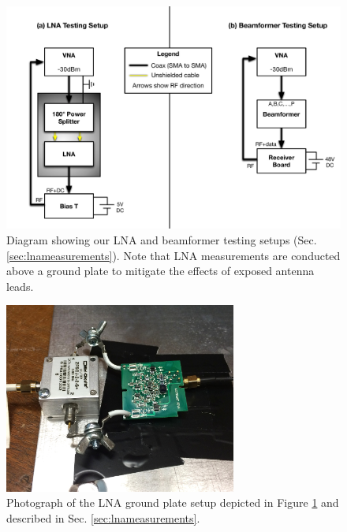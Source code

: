 \begin{figure}[t]
\centering
\includegraphics[width=6in]{chap2_beamforming_errors/vna_measurements_diagram.pdf}
\caption[Diagram showing our LNA and beamformer testing setups.]{Diagram showing our LNA and beamformer testing setups (Sec. \ref{sec:lnameasurements}). Note that LNA measurements are conducted above a ground plate to mitigate the effects of exposed antenna leads.}
\label{fig:experimentalsetup}
\end{figure}

\begin{figure}[b]
\centering
\includegraphics[width=3in]{chap2_beamforming_errors/new_lna_setup.jpg}
\caption[Photograph of the LNA ground plate setup.]{Photograph of the LNA ground plate setup depicted in Figure \ref{fig:experimentalsetup} and described in Sec. \ref{sec:lnameasurements}.}
\label{fig:newlnasetup}
\end{figure}

